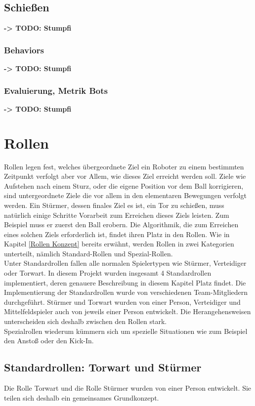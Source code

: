 \documentclass[fontsize=12pt,a4paper,final]{scrartcl}[2003/01/01]
\begin{document}
\subsection{Schie{\ss}en}\label{sse:Elem Bew:Schiessen}
\textbf{-> TODO: Stumpfi}
\subsubsection{Behaviors}
\textbf{-> TODO: Stumpfi}
\subsubsection{Evaluierung, Metrik Bots}
\textbf{-> TODO: Stumpfi}

\section{Rollen}

Rollen legen fest, welches übergeordnete Ziel ein Roboter zu einem bestimmten Zeitpunkt verfolgt aber vor Allem, wie dieses Ziel erreicht werden soll. Ziele wie Aufstehen nach einem Sturz, oder die eigene Position vor dem Ball korrigieren, sind untergeordnete Ziele die vor allem in den elementaren Bewegungen verfolgt werden. Ein Stürmer, dessen finales Ziel es ist, ein Tor zu schießen, muss natürlich einige Schritte Vorarbeit zum Erreichen dieses Ziels leisten. Zum Beispiel muss er zuerst den Ball erobern. Die Algorithmik, die zum Erreichen eines solchen Ziels erforderlich ist, findet ihren Platz in den Rollen. Wie in Kapitel \ref{Rollen Konzept} bereits erwähnt, werden Rollen in zwei Kategorien unterteilt, nämlich Standard-Rollen und Spezial-Rollen.
\\
Unter Standardrollen fallen alle normalen Spielertypen wie Stürmer, Verteidiger oder Torwart. In diesem Projekt wurden insgesamt 4 Standardrollen implementiert, deren genauere Beschreibung in diesem Kapitel Platz findet. Die Implementierung der Standardrollen wurde von verschiedenen Team-Mitgliedern durchgeführt. Stürmer und Torwart wurden von einer Person, Verteidiger und Mittelfeldspieler auch von jeweils einer Person entwickelt. Die Herangehensweisen unterscheiden sich deshalb zwischen den Rollen stark.
\\

Spezialrollen wiederum kümmern sich um spezielle Situationen wie zum Beispiel den Anstoß oder den Kick-In.


\subsection{Standardrollen: Torwart und Stürmer}
Die Rolle Torwart und die Rolle Stürmer wurden von einer Person entwickelt. Sie teilen sich deshalb ein gemeinsames Grundkonzept.
\end{document}
